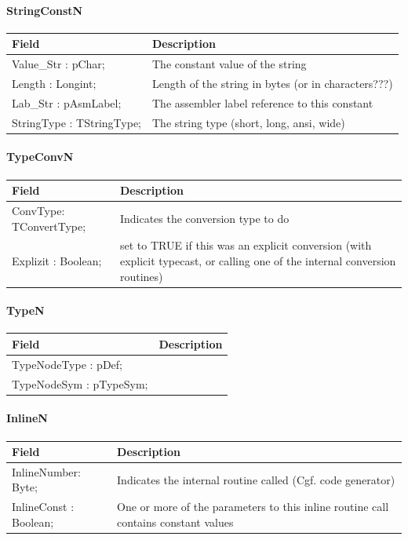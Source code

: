 \documentclass [a4paper,12pt]{article}
\begin{document}
\paragraph{StringConstN}\mbox{}

\begin{longtable}{|l|p{10cm}|}
\hline
Field	& Description \\
\hline
\endhead
\hline
\endfoot
\textsf{Value{\_}Str : pChar;}    & The constant value of the string \\
\textsf{Length : Longint;}	  & Length of the string in bytes (or in characters???) \\
\textsf{Lab{\_}Str : pAsmLabel;}  & The assembler label reference to this constant \\
\textsf{StringType : TStringType;}& The string type (short, long, ansi, wide)
\label{tab22}
\end{longtable}

\paragraph{TypeConvN}\mbox{}

\begin{longtable}{|l|p{10cm}|}
\hline
Field	& Description \\
\hline
\endhead
\hline
\endfoot
\textsf{ConvType: TConvertType;}& Indicates the conversion type to do \\
\textsf{Explizit : Boolean;}&
	set to TRUE if this was an explicit conversion (with explicit
	typecast, or calling one of the internal conversion routines)
\label{tab23}
\end{longtable}

\paragraph{TypeN}\mbox{}

\begin{longtable}{|l|p{10cm}|}
\hline
Field	& Description \\
\hline
\endhead
\hline
\endfoot
\textsf{TypeNodeType : pDef;}&  \\
\textsf{TypeNodeSym : pTypeSym;}& 
\label{tab24}
\end{longtable}

\paragraph{InlineN}\mbox{}

\begin{longtable}{|l|p{10cm}|}
\hline
Field	& Description \\
\hline
\endhead
\hline
\endfoot
\textsf{InlineNumber: Byte;}    &  Indicates the internal routine called (Cgf. code generator) \\
\textsf{InlineConst : Boolean;} &
	One or more of the parameters to this inline routine call contains
	constant values
\label{tab25}
\end{longtable}
\end{document}
